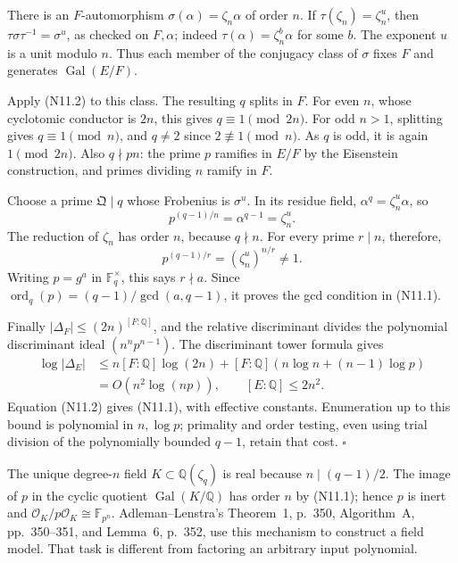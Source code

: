 There is an \(F\)-automorphism \(\sigma(\alpha)=\zeta_n\alpha\) of order
\(n\). If \(\tau(\zeta_n)=\zeta_n^u\), then
\(\tau\sigma\tau^{-1}=\sigma^u\), as checked on \(F,\alpha\);
indeed \(\tau(\alpha)=\zeta_n^b\alpha\) for some \(b\).
The exponent \(u\) is a unit modulo \(n\). Thus each member of the
conjugacy class of \(\sigma\) fixes \(F\) and generates
\(\operatorname{Gal}(E/F)\).

Apply (N11.2) to this class. The resulting \(q\) splits in \(F\).
For even \(n\), whose cyclotomic conductor is \(2n\), this gives
\(q\equiv1\pmod{2n}\).
For odd \(n>1\), splitting gives \(q\equiv1\pmod n\), and \(q\ne2\)
since \(2\not\equiv1\pmod n\). As \(q\) is odd, it is again
\(1\pmod{2n}\). Also \(q\nmid pn\): the prime \(p\) ramifies in \(E/F\)
by the Eisenstein construction, and primes dividing \(n\) ramify in \(F\).

Choose a prime \(\mathfrak Q\mid q\) whose Frobenius is \(\sigma^u\).
In its residue field,
\(\alpha^q=\zeta_n^u\alpha\), so
\[
                    p^{(q-1)/n}=\alpha^{q-1}=\zeta_n^u .
\]
The reduction of \(\zeta_n\) has order \(n\), because \(q\nmid n\).
For every prime \(r\mid n\), therefore,
\[
                     p^{(q-1)/r}=(\zeta_n^u)^{n/r}\ne1.
\]
Writing \(p=g^a\) in \(\mathbb F_q^\times\), this says \(r\nmid a\).
Since \(\operatorname{ord}_q(p)=(q-1)/\gcd(a,q-1)\), it proves the gcd
condition in (N11.1).

Finally \(|\Delta_F|\leq(2n)^{[F:\mathbb Q]}\), and the relative
discriminant divides the polynomial discriminant ideal
\((n^np^{n-1})\). The discriminant tower formula gives
\[
 \begin{split}
 \log|\Delta_E|
 &\leq n[F:\mathbb Q]\log(2n)
       +[F:\mathbb Q](n\log n+(n-1)\log p)\\
 &=O(n^2\log(np)),\qquad [E:\mathbb Q]\leq2n^2.
 \end{split}
\]
Equation (N11.2) gives (N11.1), with effective constants.
Enumeration up to this bound is polynomial in \(n,\log p\);
primality and order testing, even using trial division of the
polynomially bounded \(q-1\), retain that cost. \(\square\)

The unique degree-\(n\) field \(K\subset\mathbb Q(\zeta_q)\) is real
because \(n\mid(q-1)/2\). The image of \(p\) in the cyclic quotient
\(\operatorname{Gal}(K/\mathbb Q)\) has order \(n\) by (N11.1);
hence \(p\) is inert and \(\mathcal O_K/p\mathcal O_K\cong\mathbb F_{p^n}\).
Adleman--Lenstra's Theorem~1, p.~350, Algorithm~A, pp.~350--351,
and Lemma~6, p.~352, use this mechanism to construct a field model.
That task is different from factoring an arbitrary input polynomial.

